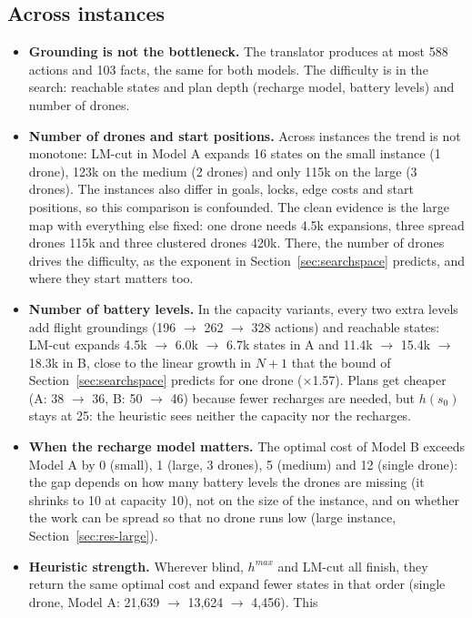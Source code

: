 \documentclass[11pt,a4paper]{article}
\begin{document}
\subsection{Across instances}
\label{sec:across}
\begin{itemize}
  \item \textbf{Grounding is not the bottleneck.} The translator produces at
    most 588 actions and 103 facts, the same for both models. The difficulty
    is in the search: reachable states and plan depth (recharge model,
    battery levels) and number of drones.
  \item \textbf{Number of drones and start positions.} Across instances the trend is not
    monotone: LM-cut in Model A expands 16 states on the small instance (1
    drone), 123k on the medium (2 drones) and only 115k on the large (3
    drones). The instances also differ in goals, locks, edge costs and start
    positions, so this comparison is confounded. The clean evidence is the
    large map with everything else fixed: one drone needs 4.5k expansions,
    three spread drones 115k and three clustered drones 420k. There, the
    number of drones drives the difficulty, as the exponent in
    Section~\ref{sec:searchspace} predicts, and where they start matters too.
  \item \textbf{Number of battery levels.} In the capacity variants, every two extra levels add flight groundings (196 $\to$ 262 $\to$ 328 actions)
    and reachable states: LM-cut expands 4.5k $\to$ 6.0k $\to$ 6.7k states in
    A and 11.4k $\to$ 15.4k $\to$ 18.3k in B, close to the linear growth in
    $N{+}1$ that the bound of Section~\ref{sec:searchspace} predicts for one
    drone ($\times$1.57). Plans get cheaper (A: 38 $\to$ 36, B: 50 $\to$ 46)
    because fewer recharges are needed, but $h(s_0)$ stays at 25: the
    heuristic sees neither the capacity nor the recharges.
  \item \textbf{When the recharge model matters.} The optimal cost of Model B
    exceeds Model A by 0 (small), 1 (large, 3 drones), 5 (medium) and 12
    (single drone): the gap depends on how many battery levels the drones
    are missing (it shrinks to 10 at capacity 10), not on the size of the
    instance, and on whether the work can be spread so that no drone runs
    low (large instance, Section~\ref{sec:res-large}).
  \item \textbf{Heuristic strength.} Wherever blind, $h^{max}$ and LM-cut all
    finish, they return the same optimal cost and expand fewer states in that
    order (single drone, Model A: 21,639 $\to$ 13,624 $\to$ 4,456). This

\end{itemize}
\end{document}
